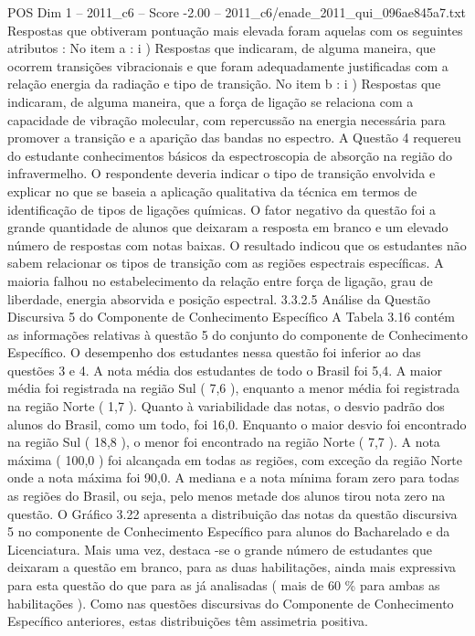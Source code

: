 \begin{textsample}{POS Dim 1 – 2011\_c6 – Score -2.00 – 2011\_c6/enade\_2011\_qui\_096ae845a7.txt}
Respostas que obtiveram pontuação mais elevada foram aquelas com os seguintes atributos : No item a : i ) Respostas que indicaram, de alguma maneira, que ocorrem transições vibracionais e que foram adequadamente justificadas com a relação energia da radiação e tipo de transição.
No item b : i ) Respostas que indicaram, de alguma maneira, que a força de ligação se relaciona com a capacidade de vibração molecular, com repercussão na energia necessária para promover a transição e a aparição das bandas no espectro.
A Questão 4 requereu do estudante conhecimentos básicos da espectroscopia de absorção na região do infravermelho.
O respondente deveria indicar o tipo de transição envolvida e explicar no que se baseia a aplicação qualitativa da técnica em termos de identificação de tipos de ligações químicas.
O fator negativo da questão foi a grande quantidade de alunos que deixaram a resposta em branco e um elevado número de respostas com notas baixas.
O resultado indicou que os estudantes não sabem relacionar os tipos de transição com as regiões espectrais específicas.
A maioria falhou no estabelecimento da relação entre força de ligação, grau de liberdade, energia absorvida e posição espectral. 3.3.2.5 Análise da Questão Discursiva 5 do Componente de Conhecimento Específico A Tabela 3.16 contém as informações relativas à questão 5 do conjunto do componente de Conhecimento Específico.
O desempenho dos estudantes nessa questão foi inferior ao das questões 3 e 4.
A nota média dos estudantes de todo o Brasil foi 5,4.
A maior média foi registrada na região Sul ( 7,6 ), enquanto a menor média foi registrada na região Norte ( 1,7 ).
Quanto à variabilidade das notas, o desvio padrão dos alunos do Brasil, como um todo, foi 16,0.
Enquanto o maior desvio foi encontrado na região Sul ( 18,8 ), o menor foi encontrado na região Norte ( 7,7 ).
A nota máxima ( 100,0 ) foi alcançada em todas as regiões, com exceção da região Norte onde a nota máxima foi 90,0.
A mediana e a nota mínima foram zero para todas as regiões do Brasil, ou seja, pelo menos metade dos alunos tirou nota zero na questão.
O Gráfico 3.22 apresenta a distribuição das notas da questão discursiva 5 no componente de Conhecimento Específico para alunos do Bacharelado e da Licenciatura.
Mais uma vez, destaca -se o grande número de estudantes que deixaram a questão em branco, para as duas habilitações, ainda mais expressiva para esta questão do que para as já analisadas ( mais de 60 \% para ambas as habilitações ).
Como nas questões discursivas do Componente de Conhecimento Específico anteriores, estas distribuições têm assimetria positiva.

\end{textsample}
